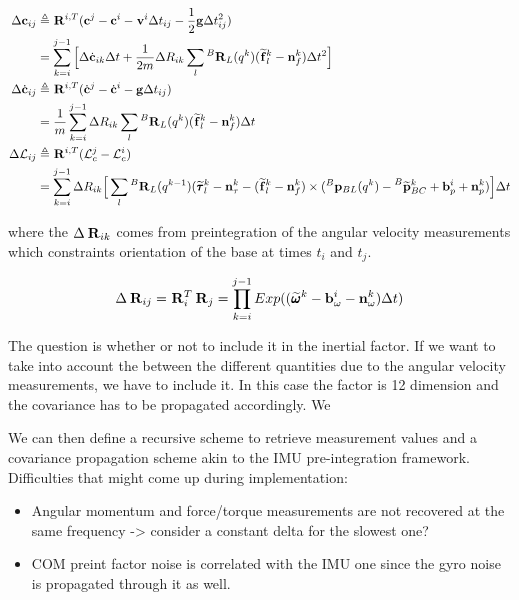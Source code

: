 \documentclass[11pt]{article}
\newcommand{\Rot}[2]{\prescript{#1}{}{\bfR}_{#2}}
\newcommand{\noise}{\bfn}
\newcommand{\bias}{\bfb}
\newcommand{\posi}[2]{\prescript{#1}{}{\bfp}_{#2}}
\newcommand{\posim}[2]{\prescript{#1}{}{\widetilde{\bfp}}_{#2}}
\newcommand{\vel}[2]{\prescript{#1}{}{\bfv}_{#2}}
\newcommand{\angvelm}[2]{\prescript{#1}{}{\widetilde{\pmb{\omega}}}_{#2}}
\newcommand{\forcem}[2]{\prescript{#1}{}{\widetilde{\bff}}_{#2}}
\newcommand{\torquem}[2]{\prescript{#1}{}{\widetilde{\pmb{\tau}}}_{#2}}
\newcommand{\AM}{\mathcal{L}}
\newcommand{\COM}{\bfc}
\newcommand{\COMd}{\dot{\bfc}}
\newcommand{\grav}{\bfg}
\begin{document}
\begin{equation}
\begin{split}
    \Delta \COM_{ij} &\triangleq \Rot{}{}^{i,T} (\COM^j - \COM^i - \vel{}{}^i \Delta t_{ij} - \frac{1}{2}\grav \Delta t_{ij}^2) 
    \\
    &= \sum_{k=i}^{j-1} \Big[ \Delta \COMd_{ik} \Delta t + \frac{1}{2m} \Delta R_{ik} \sum_l \Rot{B}{L}(q^{k}) (\forcem{}{l}^{k} - \noise_f^{k}) \Delta t^2 \Big]
\\
    \Delta \COMd_{ij} &\triangleq \Rot{}{}^{i,T} (\COMd^{j} - \COMd^{i} - \bfg \Delta t_{ij})
\\
    &= \frac{1}{m} \sum_{k=i}^{j-1} \Delta R_{ik} \sum_l \Rot{B}{L}(q^{k}) (\forcem{}{l}^{k} - \noise_f^{k}) \Delta t 
\\
    \Delta \AM_{ij} &\triangleq \Rot{}{}^{i,T} (\AM_c^{j} - \AM_c^{i})
\\
     &=  \sum_{k=i}^{j-1} \Delta R_{ik} \Big[ 
    \sum_l \Rot{B}{L}(q^{k-1}) (\torquem{}{l}^{k} - \noise_{\tau}^{k} - (\forcem{}{l}^{k} - \noise_f^{k}) \times (\posi{B}{BL}(q^k) - \posim{B}{BC}^k + \bias_{p}^i + \noise_p^k) \Big]  \Delta t
\end{split}
\label{eq:DeltaDT}
\end{equation}

where the $\Delta \Rot{}{ik}$ comes from preintegration of the angular velocity measurements which constraints orientation of the base at times $t_i$ and $t_j$.

\begin{equation}
    \Delta \Rot{}{ij} = \Rot{}{i}^T \Rot{}{j}
    = \prod_{k=i}^{j-1} Exp((\angvelm{}{}^k - \bias_{\omega}^i - \noise_{\omega}^k)\Delta t)
    \label{eq:DeltaR}
\end{equation}

The question is whether or not to include it in the inertial factor. If we want to take into account the between the different quantities due to the angular velocity measurements, we have to include it. In this case the factor is 12 dimension and the covariance has to be propagated accordingly. We  


We can then define a recursive scheme to retrieve measurement values and a covariance propagation scheme akin to the IMU pre-integration framework. 
Difficulties that might come up during implementation:

\begin{itemize}
    \item Angular momentum and force/torque measurements are not recovered at the same frequency -> consider a constant delta for the slowest one?
    \item COM preint factor noise is correlated with the IMU one since the gyro noise is propagated through it as well.
\end{itemize}
\end{document}
